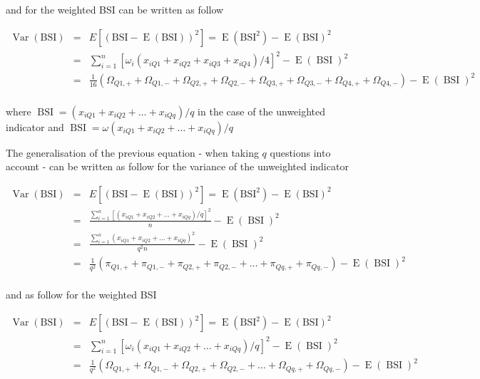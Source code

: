 \documentclass[12pt,a4paper,oneside]{book}
\DeclareMathOperator{\Var}{Var}
\DeclareMathOperator{\E}{E}
\DeclareMathOperator{\BSI}{BSI}
\begin{document}
and for the weighted BSI can be written as follow

\begin{eqnarray}
         \Var(\text{BSI}) &=& E \left[ \left(\text{BSI}-\E(\text{BSI}) \right)^2 \right] =  \E \left( \text{BSI}^2\right) - \E \left( \text{BSI}\right)^2 \\ 
         &=&  \sum^n_{i=1} \left[\omega_i (x_{iQ1} + x_{iQ2} + x_{iQ3} + x_{iQ4})/4 \right]^2 - \E (\BSI)^2 \\
         &=& \frac{1}{16} \left( \Omega_{Q1,+} + \Omega_{Q1,-} + \Omega_{Q2,+} + \Omega_{Q2,-} + \Omega_{Q3,+} + \Omega_{Q3,-} + \Omega_{Q4,+} + \Omega_{Q4,-} \right) - \E (\BSI)^2 \nonumber \\ 
\end{eqnarray}

where $\BSI = \left(x_{i Q1} + x_{i Q2} + \ldots + x_{i Qq} \right) / q $ in the case of the unweighted indicator and $\BSI = \omega \left(x_{i Q1} + x_{i Q2} + \ldots + x_{i Qq} \right) / q $



The generalisation of the previous equation - when taking $q$ questions into account - can be written as follow for the variance of the unweighted indicator

\begin{eqnarray}
         \Var(\text{BSI}) &=& E \left[ \left(\text{BSI}-\E(\text{BSI}) \right)^2 \right] =  \E \left( \text{BSI}^2\right) - \E \left( \text{BSI}\right)^2 \\ 
         &=&  \frac{\sum^n_{i=1}[(x_{iQ1} + x_{iQ2} + \ldots + x_{iQq})/q]^2}{n} - \E (\BSI)^2 \\
        &=&  \frac{\sum^n_{i=1}(x_{iQ1} + x_{iQ2} + \ldots + x_{iQq})^2}{q^2 n} - \E (\BSI)^2 \\
        &=& \frac{1}{q^2} \left( \pi_{Q1,+} + \pi_{Q1,-} + \pi_{Q2,+} + \pi_{Q2,-} + \ldots + \pi_{Qq,+} + \pi_{Qq,-} \right) - \E (\BSI)^2 \nonumber \\ 
\end{eqnarray}

and as follow for the weighted BSI

\begin{eqnarray}
         \Var(\text{BSI}) &=& E \left[ \left(\text{BSI}-\E(\text{BSI}) \right)^2 \right] =  \E \left( \text{BSI}^2\right) - \E \left( \text{BSI}\right)^2 \\ 
         &=&  \sum^n_{i=1} \left[\omega_i (x_{iQ1} + x_{iQ2} + \ldots + x_{iQq})/q \right]^2 - \E (\BSI)^2 \\
         &=& \frac{1}{q^2} \left( \Omega_{Q1,+} + \Omega_{Q1,-} + \Omega_{Q2,+} + \Omega_{Q2,-} + \ldots + \Omega_{Qq,+} + \Omega_{Qq,-} \right) - \E (\BSI)^2 \nonumber \\ 
\end{eqnarray}
\end{document}
